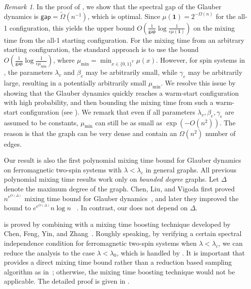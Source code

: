 \documentclass[11pt]{amsart}
\theoremstyle{definition}
\theoremstyle{remark}
\newtheorem*{remark}{Remark}
\begin{document}
\begin{remark}
In the proof of , we show that the spectral gap of the Glauber dynamics is $\textsf{gap} = \widetilde{\Omega}(n^{-1})$, which is optimal.
Since $\mu(\boldsymbol{1}) = 2^{-\Omega(n)}$ for the all-1 configuration, this yields the upper bound $O\left(\frac{1}{\textsf{gap}} \log \frac{1}{\epsilon \mu(\boldsymbol{1})}\right)$
on the mixing time from the all-1 starting configuration. For the mixing time from an arbitrary starting configuration, the standard approach is to use the bound
$O\left(\frac{1}{\textsf{gap}} \log \frac{1}{\epsilon \mu_{\min}}\right)$,
where $\mu_{\min} = \min_{x \in \{0,1\}^V} \mu(x)$. However, for spin systems in , 
the parameters $\lambda_v$ and $\beta_e$ may be arbitrarily small, while $\gamma_e$ may be arbitrarily large, resulting in a potentially arbitrarily small $\mu_{\min}$. 
We resolve this issue by showing that the Glauber dynamics quickly reaches a warm-start configuration with high probability, and then bounding the mixing time from such a warm-start configuration (see ). 
We remark that even if all parameters $\lambda_v, \beta_e, \gamma_e$ are assumed to be constants, $\mu_{\min}$ can still be as small as $\exp(-O(n^2))$. 
The reason is that the graph can be very dense and contain an $\Omega(n^2)$ number of edges. 
\end{remark}

Our result is also the first polynomial mixing time bound for Glauber dynamics on ferromagnetic two-spin systems with $\lambda < \lambda_c$ in general graphs. All previous polynomial mixing time results work only on \emph{bounded degree} graphs.
Let $\Delta$ denote the maximum degree of the graph.
Chen, Liu, and Vigoda first proved $n^{{e^{O(\Delta)}}}$ mixing time bound for Glauber dynamics~\cite{CLV23}, and later they improved the bound to $e^{e^{O(\Delta)}} n \log n$ ~\cite{CLV21}.
In contrast, our  does not depend on $\Delta$.

 is proved by combining  with a mixing time boosting technique developed by Chen, Feng, Yin, and Zhang~\cite{CFYZ21}. Roughly speaking, by verifying a certain spectral independence condition \cite{ALO24} for ferromagnetic two-spin systems when $\lambda < \lambda_c$, we can reduce the analysis to the case $\lambda < \lambda_0$, which is handled by .
It is important that  provides a direct mixing time bound rather than a reduction based sampling algorithm as in~\cite{GoldbergJP03, LiuLZ14}; otherwise, the mixing time boosting technique would not be applicable. The detailed proof is given in .
\end{document}
